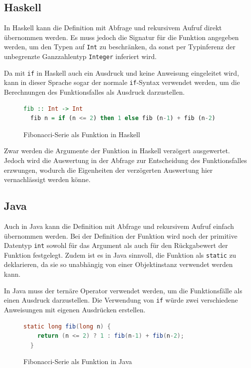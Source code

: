 \documentclass[11pt, parskip=half]{scrartcl}       %
\begin{document}
\subsection{Haskell}

In Haskell kann die Definition mit Abfrage und rekursivem Aufruf direkt übernommen werden.
Es muss jedoch die Signatur für die Funktion angegeben werden, um den Typen auf \texttt{Int} zu beschränken, da sonst per Typinferenz der unbegrenzte Ganzzahlentyp \texttt{Integer} inferiert wird.

Da mit \texttt{if} in Haskell auch ein Ausdruck und keine Anweisung eingeleitet wird, kann in dieser Sprache sogar der normale \texttt{if}-Syntax verwendet werden, um die Berechnungen des Funktionsfalles als Ausdruck darzustellen.

\begin{figure}[h]
  \centering
\begin{lstlisting}[language=haskell]
  fib :: Int -> Int
  fib n = if (n <= 2) then 1 else fib (n-1) + fib (n-2)
\end{lstlisting}  
  \caption{Fibonacci-Serie als Funktion in Haskell}
  \label{fig:code-haskell}
\end{figure}

Zwar werden die Argumente der Funktion in Haskell verzögert ausgewertet.
Jedoch wird die Auswertung in der Abfrage zur Entscheidung des Funktionsfalles erzwungen, wodurch die Eigenheiten der verzögerten Auswertung hier vernachlässigt werden könne.


\subsection{Java}

Auch in Java kann die Definition mit Abfrage und rekursivem Aufruf einfach übernommen werden.
Bei der Definition der Funktion wird noch der primitive Datentyp \texttt{int} sowohl für das Argument als auch für den Rückgabewert der Funktion festgelegt.
Zudem ist es in Java sinnvoll, die Funktion als \texttt{static} zu deklarieren, da sie so unabhängig von einer Objektinstanz verwendet werden kann.

In Java muss der ternäre Operator verwendet werden, um die Funktionsfälle als einen Ausdruck darzustellen.
Die Verwendung von \texttt{if} würde zwei verschiedene Anweisungen mit eigenen Ausdrücken erstellen.

\begin{figure}[h]
  \centering
\begin{lstlisting}[language=java]
  static long fib(long n) {
    return (n <= 2) ? 1 : fib(n-1) + fib(n-2);
  }
\end{lstlisting}  
  \caption{Fibonacci-Serie als Funktion in Java}
  \label{fig:code-java}
\end{figure}
\end{document}
